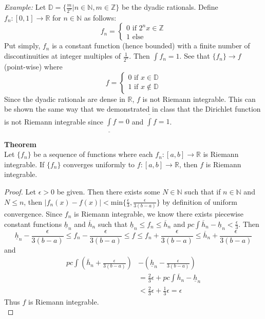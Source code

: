 \documentclass[12pt]{article}
\begin{document}
	\textit{Example:} Let $\mathbb{D} = \{\frac{m}{2^n} \vert n \in \mathbb{N},m \in \mathbb{Z}\}$ be the dyadic rationals.
	Define $f_n:[0,1] \to \mathbb{R}$ for $n \in \mathbb{N}$ as follows: 
	\[
		f_n = 
			\begin{cases}
				0 \text{ if } 2^nx \in \mathbb{Z}\\
				1 \text{ else }
			\end{cases}
	\]
	Put simply, $f_n$ is a constant function (hence bounded) with a finite number of discontinuities at integer multiples of $\frac{1}{2^n}$. Then $\int f_n = 1$. See that $\{f_n\} \to f$ (point-wise) where
	\[
		f = 
			\begin{cases}
				0 \text{ if } x \in \mathbb{D} \\
				1 \text{ if } x \notin \mathbb{D}
			\end{cases}
	\]
	Since the dyadic rationals are dense in $\mathbb{R}$, $f$ is not Riemann integrable. This can be shown the same way that we demonstrated in class that the Dirichlet function is not Riemann integrable since $\underline{\int} f = 0$ and $\overline {\int} f = 1$. \bigbreak
	
	\textbf{Theorem}\\
	Let $\{f_n\}$ be a sequence of functions where each $f_n:[a,b] \to \mathbb{R}$ is Riemann integrable. If $\{f_n\}$ converges uniformly to $f:[a,b] \to \mathbb{R}$, then $f$ is Riemann integrable.
	\begin{proof}
		Let $\epsilon > 0$ be given. Then there exists some $N \in \mathbb{N}$ such that if $n \in \mathbb{N}$ and $N \leq n$, then $\vert f_n(x) - f(x) \vert < \text{min}\Big\{\frac{\epsilon}{3}, \frac{\epsilon}{3(b-a)}\Big\}$ by definition of uniform convergence. Since $f_n$ is Riemann integrable, we know there exists piecewise constant functions $\underline{h}_n$ and $\overline{h}_n$ such that $\underline{h}_n \leq f_n \leq \overline{h}_n$ and $\textit{pc}\int \overline{h}_n - \underline{h}_n < \frac{\epsilon}{3}$. Then
		$$
		\underline{h}_n - \frac{\epsilon}{3(b-a)} \leq f_n - \frac{\epsilon}{3(b-a)} \leq f \leq f_n + \frac{\epsilon}{3(b-a)} \leq \overline{h}_n +\frac{\epsilon}{3(b-a)}
		$$
		and 
		\begin{align*}
			\textit{pc}\int (\overline{h}_n +\frac{\epsilon}{3(b-a)}) & - (\underline{h}_n - \frac{\epsilon}{3(b-a)}) \\
			& = \frac{2}{3}\epsilon + \textit{pc}\int \overline{h}_n - \underline{h}_n \\
			& < \frac{2}{3}\epsilon + \frac{1}{3}\epsilon = \epsilon
		\end{align*}
		Thus $f$ is Riemann integrable.\\
	\end{proof}
\end{document}
